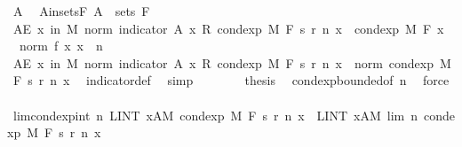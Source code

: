 \begin{isabellebody}
\ A\ \isamarkupfalse%
\ A{\isacharunderscore}{\kern0pt}in{\isacharunderscore}{\kern0pt}sets{\isacharunderscore}{\kern0pt}F{\isacharcolon}{\kern0pt}\ {\isachardoublequoteopen}A\ {\isasymin}\ sets\ F{\isachardoublequoteclose}\isanewline
\ \ \ \ \isamarkupfalse%
\ {\isachardoublequoteopen}AE\ x\ in\ M{\isachardot}{\kern0pt}\ norm\ {\isacharparenleft}{\kern0pt}indicator\ A\ x\ {\isacharasterisk}{\kern0pt}\isactrlsub R\ cond{\isacharunderscore}{\kern0pt}exp\ M\ F\ {\isacharparenleft}{\kern0pt}s\ {\isacharparenleft}{\kern0pt}r\ n{\isacharparenright}{\kern0pt}{\isacharparenright}{\kern0pt}\ x{\isacharparenright}{\kern0pt}\ {\isasymle}\ cond{\isacharunderscore}{\kern0pt}exp\ M\ F\ {\isacharparenleft}{\kern0pt}{\isasymlambda}x{\isachardot}{\kern0pt}\ {}\ {\isacharasterisk}{\kern0pt}\ norm\ {\isacharparenleft}{\kern0pt}f\ x{\isacharparenright}{\kern0pt}{\isacharparenright}{\kern0pt}\ x{\isachardoublequoteclose}\ \ n\isanewline
\ \ \ \ \isamarkupfalse%
\ {\isacharminus}{\kern0pt}\isanewline
\ \ \ \ \ \ \isamarkupfalse%
\ {\isachardoublequoteopen}AE\ x\ in\ M{\isachardot}{\kern0pt}\ norm\ {\isacharparenleft}{\kern0pt}indicator\ A\ x\ {\isacharasterisk}{\kern0pt}\isactrlsub R\ cond{\isacharunderscore}{\kern0pt}exp\ M\ F\ {\isacharparenleft}{\kern0pt}s\ {\isacharparenleft}{\kern0pt}r\ n{\isacharparenright}{\kern0pt}{\isacharparenright}{\kern0pt}\ x{\isacharparenright}{\kern0pt}\ {\isasymle}\ norm\ {\isacharparenleft}{\kern0pt}cond{\isacharunderscore}{\kern0pt}exp\ M\ F\ {\isacharparenleft}{\kern0pt}s\ {\isacharparenleft}{\kern0pt}r\ n{\isacharparenright}{\kern0pt}{\isacharparenright}{\kern0pt}\ x{\isacharparenright}{\kern0pt}{\isachardoublequoteclose}\ \isamarkupfalse%
\ indicator{\isacharunderscore}{\kern0pt}def\ \isamarkupfalse%
\ simp\isanewline
\ \ \ \ \ \ \isamarkupfalse%
\ {\isacharquery}{\kern0pt}thesis\ \isamarkupfalse%
\ cond{\isacharunderscore}{\kern0pt}exp{\isacharunderscore}{\kern0pt}bounded{\isacharbrackleft}{\kern0pt}of\ n{\isacharbrackright}{\kern0pt}\ \isamarkupfalse%
\ force\isanewline
\ \ \ \ \isamarkupfalse%
\isanewline
\ \ \ \ \isamarkupfalse%
\ lim{\isacharunderscore}{\kern0pt}cond{\isacharunderscore}{\kern0pt}exp{\isacharunderscore}{\kern0pt}int{\isacharcolon}{\kern0pt}\ {\isachardoublequoteopen}{\isacharparenleft}{\kern0pt}{\isasymlambda}n{\isachardot}{\kern0pt}\ LINT\ x{\isacharcolon}{\kern0pt}A{\isacharbar}{\kern0pt}M{\isachardot}{\kern0pt}\ cond{\isacharunderscore}{\kern0pt}exp\ M\ F\ {\isacharparenleft}{\kern0pt}s\ {\isacharparenleft}{\kern0pt}r\ n{\isacharparenright}{\kern0pt}{\isacharparenright}{\kern0pt}\ x{\isacharparenright}{\kern0pt}\ {\isasymlonglonglongrightarrow}\ LINT\ x{\isacharcolon}{\kern0pt}A{\isacharbar}{\kern0pt}M{\isachardot}{\kern0pt}\ lim\ {\isacharparenleft}{\kern0pt}{\isasymlambda}n{\isachardot}{\kern0pt}\ cond{\isacharunderscore}{\kern0pt}exp\ M\ F\ {\isacharparenleft}{\kern0pt}s\ {\isacharparenleft}{\kern0pt}r\ n{\isacharparenright}{\kern0pt}{\isacharparenright}{\kern0pt}\ x{\isacharparenright}{\kern0pt}{\isachardoublequoteclose}\ \isanewline

\end{isabellebody}
